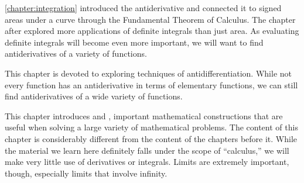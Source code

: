 


\autoref{chapter:integration} introduced the antiderivative and connected it to signed areas under a curve through the Fundamental Theorem of Calculus. The chapter after explored more applications of definite integrals than just area. As evaluating definite integrals will become even more important, we will want to find antiderivatives of a variety of functions.

This chapter is devoted to exploring techniques of antidifferentiation. While not every function has an antiderivative in terms of elementary functions,
we can still find antiderivatives of a wide variety of functions.











This chapter introduces  and , important mathematical constructions that are useful when solving a large variety of mathematical problems. The content of this chapter is considerably different from the content of the chapters before it. While the material we learn here definitely falls under the scope of ``calculus,'' we will make very little use of derivatives or integrals. Limits are extremely important, though, especially limits that involve infinity. 

